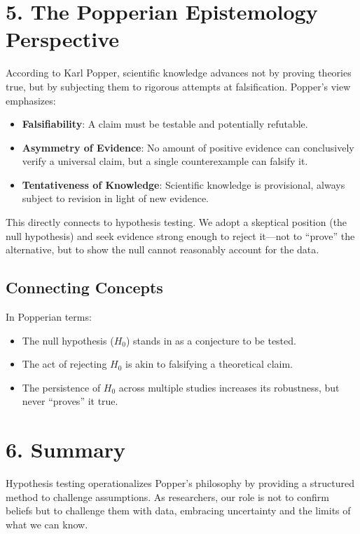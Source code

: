 \documentclass[12pt]{article}
\begin{document}
\section*{5. The Popperian Epistemology Perspective}
According to Karl Popper, scientific knowledge advances not by proving theories true, but by subjecting them to rigorous attempts at falsification. Popper’s view emphasizes:

\begin{itemize}
  \item \textbf{Falsifiability}: A claim must be testable and potentially refutable.
  \item \textbf{Asymmetry of Evidence}: No amount of positive evidence can conclusively verify a universal claim, but a single counterexample can falsify it.
  \item \textbf{Tentativeness of Knowledge}: Scientific knowledge is provisional, always subject to revision in light of new evidence.
\end{itemize}

This directly connects to hypothesis testing. We adopt a skeptical position (the null hypothesis) and seek evidence strong enough to reject it—not to ``prove'' the alternative, but to show the null cannot reasonably account for the data.

\subsection*{Connecting Concepts}
In Popperian terms:
\begin{itemize}
  \item The null hypothesis ($H_0$) stands in as a conjecture to be tested.
  \item The act of rejecting $H_0$ is akin to falsifying a theoretical claim.
  \item The persistence of $H_0$ across multiple studies increases its robustness, but never ``proves'' it true.
\end{itemize}

\section*{6. Summary}
Hypothesis testing operationalizes Popper’s philosophy by providing a structured method to challenge assumptions. As researchers, our role is not to confirm beliefs but to challenge them with data, embracing uncertainty and the limits of what we can know.
\end{document}
